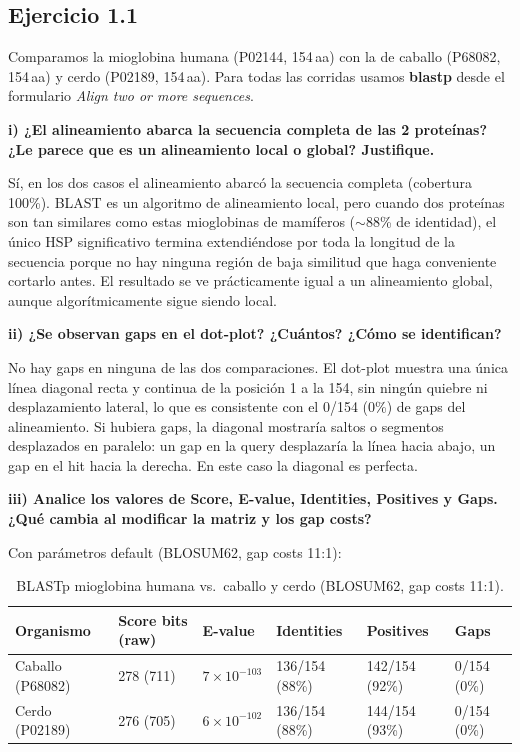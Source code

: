 \subsection{Ejercicio 1.1}

Comparamos la mioglobina humana (P02144, 154\,aa) con la de caballo (P68082, 154\,aa) y cerdo
(P02189, 154\,aa). Para todas las corridas usamos \textbf{blastp} desde el formulario
\textit{Align two or more sequences}.

\textbf{i) ¿El alineamiento abarca la secuencia completa de las 2 proteínas? ¿Le parece que es un
alineamiento local o global? Justifique.}

Sí, en los dos casos el alineamiento abarcó la secuencia completa (cobertura 100\%). BLAST es un algoritmo
de alineamiento local, pero cuando dos proteínas son tan similares como estas mioglobinas de mamíferos
($\sim$88\% de identidad), el único HSP significativo termina extendiéndose por toda la longitud de la
secuencia porque no hay ninguna región de baja similitud que haga conveniente cortarlo antes. El resultado
se ve prácticamente igual a un alineamiento global, aunque algorítmicamente sigue siendo local.

\textbf{ii) ¿Se observan gaps en el dot-plot? ¿Cuántos? ¿Cómo se identifican?}

No hay gaps en ninguna de las dos comparaciones. El dot-plot muestra una única línea diagonal recta y
continua de la posición 1 a la 154, sin ningún quiebre ni desplazamiento lateral, lo que es consistente
con el 0/154 (0\%) de gaps del alineamiento. Si hubiera gaps, la diagonal mostraría saltos o segmentos
desplazados en paralelo: un gap en la query desplazaría la línea hacia abajo, un gap en el hit hacia la
derecha. En este caso la diagonal es perfecta.

\textbf{iii) Analice los valores de Score, E-value, Identities, Positives y Gaps.
¿Qué cambia al modificar la matriz y los gap costs?}

Con parámetros default (BLOSUM62, gap costs 11:1):

\begin{table}[H]
\centering
\footnotesize
\begin{tabular}{lP{2.2cm}P{2.4cm}P{2.4cm}P{2.4cm}P{1.8cm}}
\toprule
Organismo & Score bits (raw) & E-value & Identities & Positives & Gaps \\
\midrule
Caballo (P68082) & 278 (711) & $7 \times 10^{-103}$ & 136/154 (88\%) & 142/154 (92\%) & 0/154 (0\%) \\
Cerdo (P02189)   & 276 (705) & $6 \times 10^{-102}$ & 136/154 (88\%) & 144/154 (93\%) & 0/154 (0\%) \\
\bottomrule
\end{tabular}
\caption{BLASTp mioglobina humana vs.\ caballo y cerdo (BLOSUM62, gap costs 11:1).}
\end{table}

